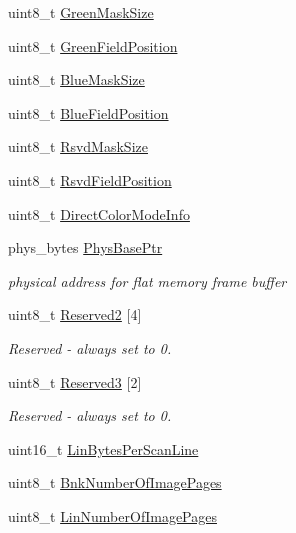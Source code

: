 \begin{DoxyCompactItemize}
\item 
uint8\+\_\+t \hyperlink{struct____attribute_____af69ef188a0f5d526ecd5f25a8d6336e3}{Green\+Mask\+Size}
\item 
uint8\+\_\+t \hyperlink{struct____attribute_____a44aab7c8026a131654e079837a95ba2b}{Green\+Field\+Position}
\item 
uint8\+\_\+t \hyperlink{struct____attribute_____ab5967602a79dcb7f0061195ffdaaa47a}{Blue\+Mask\+Size}
\item 
uint8\+\_\+t \hyperlink{struct____attribute_____ada852d5ed926757d24b5038a38e6292c}{Blue\+Field\+Position}
\item 
uint8\+\_\+t \hyperlink{struct____attribute_____a73862db83bdb9b6d31356af3cec7a5be}{Rsvd\+Mask\+Size}
\item 
uint8\+\_\+t \hyperlink{struct____attribute_____a61fb6dc07b7edbd8a3a94745336f256c}{Rsvd\+Field\+Position}
\item 
uint8\+\_\+t \hyperlink{struct____attribute_____a35fb3e1fc0dc9924bc52977b3a234f9f}{Direct\+Color\+Mode\+Info}
\item 
phys\+\_\+bytes \hyperlink{struct____attribute_____a852a4f68cfbabf08df197128e137bde6}{Phys\+Base\+Ptr}
\begin{DoxyCompactList}\small\item\em physical address for flat memory frame buffer \end{DoxyCompactList}\item 
uint8\+\_\+t \hyperlink{struct____attribute_____a534ebf7a2bdad17747cfc9cb6cc50c5c}{Reserved2} \mbox{[}4\mbox{]}
\begin{DoxyCompactList}\small\item\em Reserved -\/ always set to 0. \end{DoxyCompactList}\item 
uint8\+\_\+t \hyperlink{struct____attribute_____a9336499af9094522dbe1bfd4d43934a1}{Reserved3} \mbox{[}2\mbox{]}
\begin{DoxyCompactList}\small\item\em Reserved -\/ always set to 0. \end{DoxyCompactList}\item 
uint16\+\_\+t \hyperlink{struct____attribute_____af7036270c257deabc1ebd111faf3e3a5}{Lin\+Bytes\+Per\+Scan\+Line}
\item 
uint8\+\_\+t \hyperlink{struct____attribute_____ad5820084f2b821b85a635df8394f0d9e}{Bnk\+Number\+Of\+Image\+Pages}
\item 
uint8\+\_\+t \hyperlink{struct____attribute_____af9ba0d9902f5336bd9d044a9dee2ba42}{Lin\+Number\+Of\+Image\+Pages}

\end{DoxyCompactItemize}
